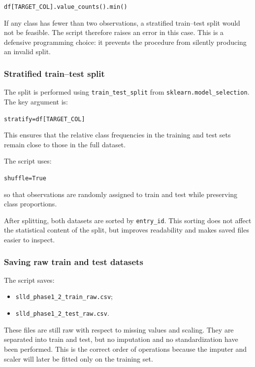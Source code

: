 \documentclass{ipgpmaster}
\begin{document}
\begin{center}
\texttt{df[TARGET\_COL].value\_counts().min()}
\end{center}

If any class has fewer than two observations, a stratified train--test split would not be feasible. The script therefore raises an error in this case. This is a defensive programming choice: it prevents the procedure from silently producing an invalid split.

\subsubsection{Stratified train--test split}

The split is performed using \texttt{train\_test\_split} from \texttt{sklearn.model\_selection}. The key argument is:

\begin{center}
\texttt{stratify=df[TARGET\_COL]}
\end{center}

This ensures that the relative class frequencies in the training and test sets remain close to those in the full dataset.

The script uses:

\begin{center}
\texttt{shuffle=True}
\end{center}

so that observations are randomly assigned to train and test while preserving class proportions.

After splitting, both datasets are sorted by \texttt{entry\_id}. This sorting does not affect the statistical content of the split, but improves readability and makes saved files easier to inspect.

\subsubsection{Saving raw train and test datasets}

The script saves:

\begin{itemize}
    \item \texttt{slld\_phase1\_2\_train\_raw.csv};
    \item \texttt{slld\_phase1\_2\_test\_raw.csv}.
\end{itemize}

These files are still raw with respect to missing values and scaling. They are separated into train and test, but no imputation and no standardization have been performed. This is the correct order of operations because the imputer and scaler will later be fitted only on the training set.
\end{document}
